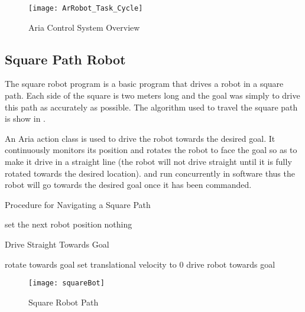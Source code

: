 \documentclass[main.tex]{subfiles}
\begin{document}
\begin{figure}[H]
\begin{center}
\texttt{[image: ArRobot\_Task\_Cycle]}
\end{center}
\caption{Aria Control System Overview}
\label{fig:ariaCtrl}
\end{figure}

\subsection{Square Path Robot}
The square robot program is a basic program that drives a robot in a square
path. Each side of the square is two meters long and the goal was simply to
drive this path as accurately as possible. The algorithm used to travel the
square path is show in . 

An Aria action class is used to drive the robot towards the desired goal. It
continuously monitors its position and rotates the robot to face the goal so as
to make it drive in a straight line (the robot will not drive straight until it
is fully rotated towards the desired location).  and
 run concurrently in software thus the robot will go
towards the desired goal once it has been commanded.

\begin{algorithm}
\caption{Procedure for Navigating a Square Path}
\label{al:alg1}
\begin{algorithmic}
		\STATE set the next robot position 
			\STATE nothing
		\ENDWHILE
	\ENDFOR
\end{algorithmic}
\end{algorithm}

\newcommand{\delxi}{\Delta\xi}

\begin{algorithm}
\caption{Drive Straight Towards Goal}
\label{al:driveStraight}
	\begin{algorithmic}
			\STATE rotate towards goal
			\STATE set translational velocity to 0
			\STATE drive robot towards goal
		\ENDIF
	\end{algorithmic}
\end{algorithm}

\begin{figure}[H]
	\begin{center}
	\texttt{[image: squareBot]}
	\end{center}
	\caption{Square Robot Path}
	\label{fig:sqBotPath}
\end{figure}
\end{document}
